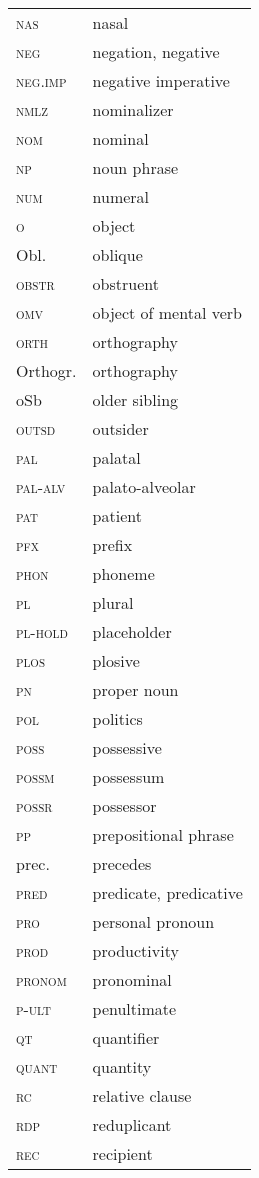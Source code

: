 \begin{tabularx}{.45\textwidth}{lX} 
\textsc{nas} & nasal\\
\textsc{neg} & {negation}, negative\\
\textsc{neg.imp} & negative {imperative}\\
\textsc{nmlz} & nominalizer\\
\textsc{nom} & nominal\\
\textsc{np} & {noun} phrase\\
\textsc{num} & {numeral}\\
\textsc{o} & object\\
Obl. & oblique\\
\textsc{obstr} & obstruent\\
\textsc{omv} & object of mental {verb}\\
\textsc{orth} & orthography\\
Orthogr. & orthography\\
oSb & older sibling\\
\textsc{outsd} & outsider\\
\textsc{pal} & palatal\\
\textsc{pal-alv} & palato-alveolar\\
\textsc{pat} & patient\\
\textsc{pfx} & prefix\\
\textsc{phon} & phoneme\\
\textsc{pl} & plural\\
\textsc{pl-hold} & {placeholder}\\
\textsc{plos} & plosive\\
\textsc{pn} & {proper noun}\\
\textsc{pol} & politics\\
\textsc{poss} & possessive\\
\textsc{possm} & possessum\\
\textsc{possr} & possessor\\
\textsc{pp} & {prepositional phrase}\\
prec. & precedes\\
\textsc{pred} & predicate, predicative\\
\textsc{pro} & personal {pronoun}\\
\textsc{prod} & productivity\\
\textsc{pronom} & pronominal\\
\textsc{p-ult} & penultimate\\
\textsc{qt} & {quantifier}\\
\textsc{quant} & quantity\\
\textsc{rc} & relative clause\\
\textsc{rdp} & reduplicant\\
\textsc{rec} & recipient\\
\end{tabularx} 
